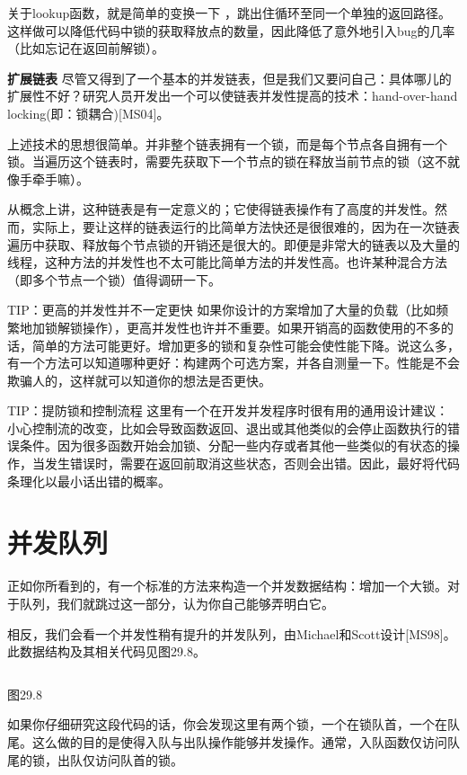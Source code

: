 关于lookup函数，就是简单的变换一下 ，跳出住循环至同一个单独的返回路径。这样做可以降低代码中锁的获取释放点的数量，因此降低了意外地引入bug的几率（比如忘记在返回前解锁）。

\textbf{扩展链表}
尽管又得到了一个基本的并发链表，但是我们又要问自己：具体哪儿的扩展性不好？研究人员开发出一个可以使链表并发性提高的技术：hand-over-hand locking(即：锁耦合)[MS04]。

上述技术的思想很简单。并非整个链表拥有一个锁，而是每个节点各自拥有一个锁。当遍历这个链表时，需要先获取下一个节点的锁在释放当前节点的锁（这不就像手牵手嘛）。

从概念上讲，这种链表是有一定意义的；它使得链表操作有了高度的并发性。然而，实际上，要让这样的链表运行的比简单方法快还是很很难的，因为在一次链表遍历中获取、释放每个节点锁的开销还是很大的。即便是非常大的链表以及大量的线程，这种方法的并发性也不太可能比简单方法的并发性高。也许某种混合方法（即多个节点一个锁）值得调研一下。

TIP：更高的并发性并不一定更快
如果你设计的方案增加了大量的负载（比如频繁地加锁解锁操作），更高并发性也许并不重要。如果开销高的函数使用的不多的话，简单的方法可能更好。增加更多的锁和复杂性可能会使性能下降。说这么多，有一个方法可以知道哪种更好：构建两个可选方案，并各自测量一下。性能是不会欺骗人的，这样就可以知道你的想法是否更快。

TIP：提防锁和控制流程
这里有一个在开发并发程序时很有用的通用设计建议：小心控制流的改变，比如会导致函数返回、退出或其他类似的会停止函数执行的错误条件。因为很多函数开始会加锁、分配一些内存或者其他一些类似的有状态的操作，当发生错误时，需要在返回前取消这些状态，否则会出错。因此，最好将代码条理化以最小话出错的概率。


\section{并发队列}
正如你所看到的，有一个标准的方法来构造一个并发数据结构：增加一个大锁。对于队列，我们就跳过这一部分，认为你自己能够弄明白它。

相反，我们会看一个并发性稍有提升的并发队列，由Michael和Scott设计[MS98]。此数据结构及其相关代码见图29.8。

\begin{figure}[h]
\begin{lstlisting}

\end{lstlisting}
\caption{}
\end{figure}
图29.8


如果你仔细研究这段代码的话，你会发现这里有两个锁，一个在锁队首，一个在队尾。这么做的目的是使得入队与出队操作能够并发操作。通常，入队函数仅访问队尾的锁，出队仅访问队首的锁。

